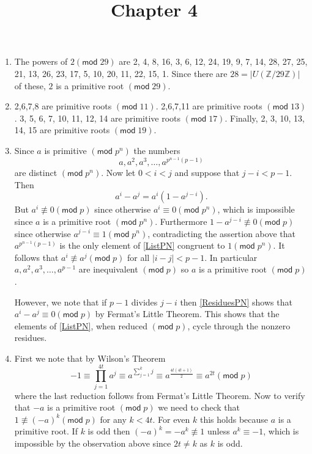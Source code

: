 \documentclass[12pt]{article}
\title{Chapter 4}
\author{}\date{}
\renewcommand{\pmod}[1]{\left(\mathsf{mod}\;#1\right)}
\begin{document}
\maketitle
\thispagestyle{empty}

\begin{enumerate}
\item %
The powers of $2\pmod{29}$ are
2, 4, 8, 16, 3, 6, 12, 24, 19, 9,
7, 14, 28, 27, 25, 21, 13, 26, 23, 17, 5, 10, 20, 11, 22, 15, 1.
Since there are $28=\left|U\left(\mathbb{Z}/29\mathbb{Z}\right)\right|$
of these, $2$ is a primitive root $\pmod{29}$.

\item %
2,6,7,8 are primitive roots $\pmod{11}$.
2,6,7,11 are primitive roots $\pmod{13}$.
3, 5, 6, 7, 10, 11, 12, 14 are primitive roots $\pmod{17}$.
Finally, 2, 3, 10, 13, 14, 15 are primitive roots $\pmod{19}$.

\item %
Since $a$ is primitive $\pmod{p^n}$ the numbers
\begin{equation}\label{ListPN}
a,a^2,a^3,\ldots,a^{p^{n-1}\left(p-1\right)}
\end{equation}
are distinct $\pmod{p^n}$.
Now let $0<i<j$ and suppose that $j-i<p-1$. Then
\begin{equation}\label{ResiduesPN}
a^i-a^j=a^i\left(1-a^{j-i}\right).
\end{equation}
But $a^i\not\equiv 0\pmod{p}$
since otherwise $a^i\equiv 0\pmod{p^n}$, which is impossible
since $a$ is a primitive root $\pmod{p^n}$.
Furthermore $1-a^{j-i}\not\equiv 0\pmod{p}$ since otherwise
$a^{j-i}\equiv 1\pmod{p^n}$, contradicting the assertion
above that
$a^{p^{n-1}\left(p-1\right)}$ is the only element of
\autoref{ListPN} congruent to $1\pmod{p^n}$.
It follows that $a^i\not\equiv a^j\pmod{p}$ for all
$\left|i-j\right|<p-1$. In particular $a,a^2,a^3,\ldots,a^{p-1}$
are inequivalent $\pmod{p}$ so $a$ is a primitive root
$\pmod{p}$.

However, we note that if $p-1$ divides $j-i$ then \autoref{ResiduesPN}
shows that $a^i-a^j\equiv 0\pmod{p}$ by Fermat's Little Theorem.
This shows that the elements of \autoref{ListPN}, when reduced
$\pmod{p}$, cycle through the nonzero residues.

\item\label{2T+1} %
First we note that by Wilson's Theorem
\[-1\equiv\prod_{j=1}^{4t}a^j
\equiv a^{\sum_{j=1}^kj}
\equiv a^{\frac{4t\left(4t+1\right)}{2}}
\equiv a^{2t}\pmod{p}\]
where the last reduction follows from Fermat's Little Theorem.
Now to verify that $-a$ is a primitive root $\pmod{p}$
we need to check that $1\not\equiv\left(-a\right)^k\pmod{p}$
for any $k<4t$. For even $k$ this holds because $a$ is a primitive root.
If $k$ is odd then
$\left(-a\right)^k=-a^k\not\equiv 1$ unless
$a^k\equiv -1$, which is impossible by the observation above
since $2t\ne k$ as $k$ is odd.


\end{enumerate}
\end{document}
